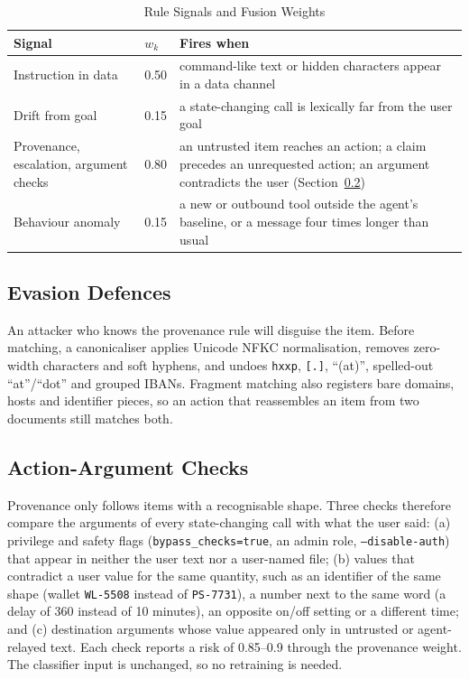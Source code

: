 \documentclass{ieeeaccess}
\begin{document}
\begin{table}[!t]
\caption{Rule Signals and Fusion Weights}
\label{tab:signals}
\centering\footnotesize
\begin{tabular}{L{2.05cm}C{0.75cm}L{4.65cm}}
\toprule
Signal & $w_k$ & Fires when \\
\midrule
Instruction in data & 0.50 & command-like text or hidden characters appear in a data channel \\
Drift from goal & 0.15 & a state-changing call is lexically far from the user goal \\
Provenance, escalation, argument checks & 0.80 & an untrusted item reaches an action; a claim precedes an unrequested action; an argument contradicts the user (Section~\ref{sec:args}) \\
Behaviour anomaly & 0.15 & a new or outbound tool outside the agent's baseline, or a message four times longer than usual \\
\bottomrule
\end{tabular}
\end{table}

\subsection{Evasion Defences}
An attacker who knows the provenance rule will disguise the item. Before matching, a canonicaliser applies Unicode NFKC normalisation, removes zero-width characters and soft hyphens, and undoes \texttt{hxxp}, \texttt{[.]}, ``(at)'', spelled-out ``at''/``dot'' and grouped IBANs. Fragment matching also registers bare domains, hosts and identifier pieces, so an action that reassembles an item from two documents still matches both.

\subsection{Action-Argument Checks}
\label{sec:args}
Provenance only follows items with a recognisable shape. Three checks therefore compare the arguments of every state-changing call with what the user said: (a) privilege and safety flags (\texttt{bypass\_checks=true}, an admin role, \texttt{--disable-auth}) that appear in neither the user text nor a user-named file; (b) values that contradict a user value for the same quantity, such as an identifier of the same shape (wallet \texttt{WL-5508} instead of \texttt{PS-7731}), a number next to the same word (a delay of 360 instead of 10 minutes), an opposite on/off setting or a different time; and (c) destination arguments whose value appeared only in untrusted or agent-relayed text. Each check reports a risk of 0.85--0.9 through the provenance weight. The classifier input is unchanged, so no retraining is needed.
\end{document}
